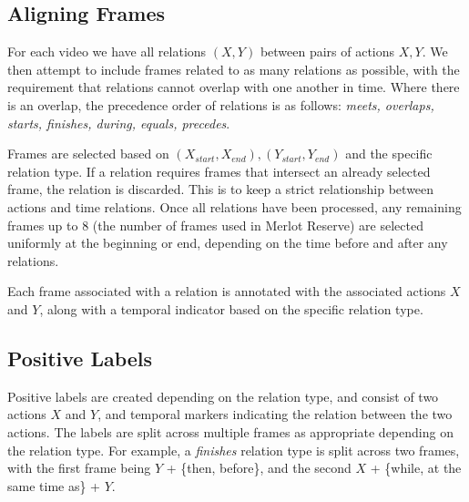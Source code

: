 \subsection{Aligning Frames}
\label{ssec:frames}

For each video we have all relations $(X, Y)$ between pairs of actions $X, Y$.
We then attempt to include frames related to as many relations as possible,
with the requirement that relations cannot overlap with one another in time.
Where there is an overlap, the precedence order of relations is as follows: \textit{meets,
overlaps, starts, finishes, during, equals, precedes}. %

Frames are selected based on $(X_{start}, X_{end}), (Y_{start}, Y_{end})$ and
the specific relation type. If a relation requires frames that intersect an
already selected frame, the relation is discarded. This is to keep a strict
relationship between actions and time relations. Once all relations have been
processed, any remaining frames up to 8 (the number of frames used in Merlot
Reserve) are selected uniformly at the beginning or end, depending on the time
before and after any relations. %

Each frame associated with a relation is annotated with the associated actions
$X$ and $Y$, along with a temporal indicator based on the specific relation
type. 


\subsection{Positive Labels}
\label{ssec:pos_labels}

Positive labels are created depending on the relation type, and consist of two
actions $X$ and $Y$, and temporal markers indicating the relation between the
two actions. The labels are split across multiple frames as appropriate
depending on the relation type. For example, a \textit{finishes} relation type
is split across two frames, with the first frame being $Y$ + \{then, before\},
and the second $X$ + \{while, at the same time as\} + $Y$. 

